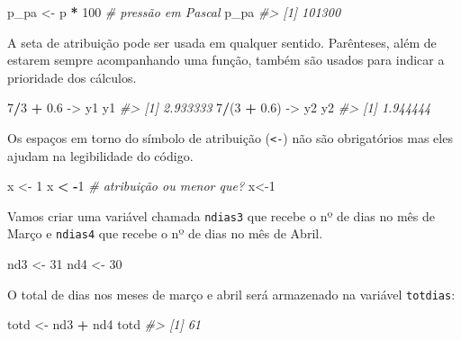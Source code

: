 \documentclass[]{book}
\newenvironment{Shaded}{\begin{snugshade}}{\end{snugshade}}
\newcommand{\DecValTok}[1]{\textcolor[rgb]{0.00,0.00,0.81}{#1}}
\newcommand{\FloatTok}[1]{\textcolor[rgb]{0.00,0.00,0.81}{#1}}
\newcommand{\StringTok}[1]{\textcolor[rgb]{0.31,0.60,0.02}{#1}}
\newcommand{\CommentTok}[1]{\textcolor[rgb]{0.56,0.35,0.01}{\textit{#1}}}
\newcommand{\OperatorTok}[1]{\textcolor[rgb]{0.81,0.36,0.00}{\textbf{#1}}}
\newcommand{\NormalTok}[1]{#1}
\begin{document}
\begin{Shaded}
\begin{Highlighting}[]
\NormalTok{p_pa <-}\StringTok{ }\NormalTok{p }\OperatorTok{*}\StringTok{ }\DecValTok{100}
\CommentTok{# pressão em Pascal}
\NormalTok{p_pa}
\CommentTok{#> [1] 101300}
\end{Highlighting}
\end{Shaded}

A seta de atribuição pode ser usada em qualquer sentido. Parênteses,
além de estarem sempre acompanhando uma função, também são usados para
indicar a prioridade dos cálculos.

\begin{Shaded}
\begin{Highlighting}[]
\DecValTok{7}\OperatorTok{/}\DecValTok{3} \OperatorTok{+}\StringTok{ }\FloatTok{0.6}\NormalTok{ ->}\StringTok{ }\NormalTok{y1}
\NormalTok{ y1}
\CommentTok{#> [1] 2.933333}
\DecValTok{7}\OperatorTok{/}\NormalTok{(}\DecValTok{3} \OperatorTok{+}\StringTok{ }\FloatTok{0.6}\NormalTok{) ->}\StringTok{ }\NormalTok{y2}
\NormalTok{ y2}
\CommentTok{#> [1] 1.944444}
\end{Highlighting}
\end{Shaded}

Os espaços em torno do símbolo de atribuição (\texttt{\textless{}-}) não
são obrigatórios mas eles ajudam na legibilidade do código.

\begin{Shaded}
\begin{Highlighting}[]
\NormalTok{x <-}\StringTok{ }\DecValTok{1}
\NormalTok{x }\OperatorTok{<}\StringTok{ }\OperatorTok{-}\DecValTok{1}
\CommentTok{# atribuição ou menor que?}
\NormalTok{x<-}\DecValTok{1} 
\end{Highlighting}
\end{Shaded}

Vamos criar uma variável chamada \texttt{ndias3} que recebe o nº de dias
no mês de Março e \texttt{ndias4} que recebe o nº de dias no mês de
Abril.

\begin{Shaded}
\begin{Highlighting}[]
\NormalTok{nd3 <-}\StringTok{ }\DecValTok{31}
\NormalTok{nd4 <-}\StringTok{ }\DecValTok{30}
\end{Highlighting}
\end{Shaded}

O total de dias nos meses de março e abril será armazenado na variável
\texttt{totdias}:

\begin{Shaded}
\begin{Highlighting}[]
\NormalTok{totd <-}\StringTok{ }\NormalTok{nd3 }\OperatorTok{+}\StringTok{ }\NormalTok{nd4}
\NormalTok{totd}
\CommentTok{#> [1] 61}
\end{Highlighting}
\end{Shaded}
\end{document}
